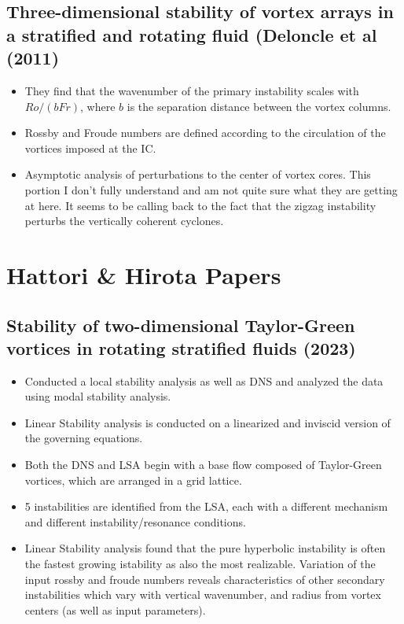 \documentclass{article}
\begin{document}
    \subsection{Three-dimensional stability of vortex arrays
in a stratified and rotating fluid (Deloncle et al (2011)}
    \begin{itemize}
        \item They find that the wavenumber of the primary instability scales
        with $Ro/(bFr)$, where $b$ is the separation distance between the vortex
        columns. 
        \item Rossby and Froude numbers are defined according to the circulation
        of the vortices imposed at the IC. 
        \item Asymptotic analysis of perturbations to the center of vortex
        cores. This portion I don't fully understand and am not quite sure what
        they are getting at here. It seems to be calling back to the fact that
        the zigzag instability perturbs the vertically coherent cyclones. 
    \end{itemize}


\section{Hattori \& Hirota Papers}
    \subsection{Stability of two-dimensional Taylor-Green vortices in rotating
    stratified fluids (2023)}
    \begin{itemize}
        \item Conducted a local stability analysis as well as DNS and analyzed the
        data using modal stability analysis. 
        \item Linear Stability analysis is conducted on a linearized and inviscid
        version of the governing equations.
        \item Both the DNS and LSA begin with a base flow composed of Taylor-Green
        vortices, which are arranged in a grid lattice. 
        \item 5 instabilities are identified from the LSA, each with a different
        mechanism and different instability/resonance conditions. 
        \item Linear Stability analysis found that the pure hyperbolic instability
        is often the fastest growing istability as also the most realizable.
        Variation of the input rossby and froude numbers reveals characteristics of
        other secondary instabilities which vary with vertical wavenumber, and
        radius from vortex centers (as well as input parameters). 
    \end{itemize}
\end{document}
